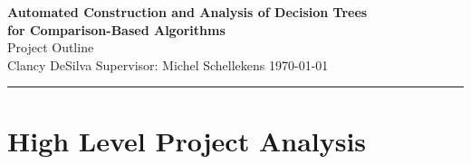 ﻿\documentclass[10pt,a4paper]{article}
\begin{document}
\begin{center}
  {\Large\bfseries Automated Construction and Analysis of Decision Trees\\[0.2em]
  for Comparison-Based Algorithms}\\[0.6em]
  {\normalsize Project Outline}\\[0.3em]
  {\small Clancy DeSilva \quad\textbullet{} \quad\textbullet\quad
  Supervisor: Michel Schellekens \quad\textbullet\quad \today}
\end{center}
\vspace{-0.5em}
\noindent\rule{\textwidth}{0.4pt}

\section{High Level Project Analysis}
\end{document}
